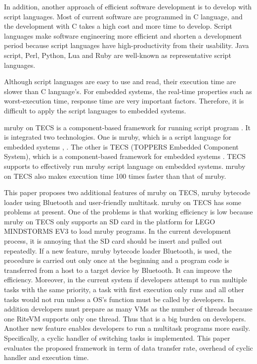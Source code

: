 \documentclass[conference,compsoc]{IEEEtran}
\begin{document}
In addition, another approach of efficient software development is to develop with script languages.
Most of current software are programmed in C language, and the development with C takes a high cost and more time to develop.
Script languages make software engineering more efficient and shorten a development period because script languages have high-productivity from their usability.
Java script, Perl, Python, Lua and Ruby are well-known as representative script languages.

Although script languages are easy to use and read, their execution time are slower than C language's.
For embedded systems, the real-time properties such as worst-execution time, response time are very important factors.
Therefore, it is difficult to apply the script languages to embedded systems.

mruby on TECS is a component-based framework for running script program \cite{par:mrubyonTECS}.
It is integrated two technologies.
One is mruby, which is a script language for embedded systems \cite{par:mruby}, \cite{url:mruby}.
The other is TECS (TOPPERS Embedded Component System), which is a component-based framework for embedded systems \cite{par:TECS}.
TECS supports to effectively run mruby script language on embedded systems.
mruby on TECS also makes execution time 100 times faster than that of mruby.

This paper proposes two additional features of mruby on TECS, mruby bytecode loader using Bluetooth and user-friendly multitask.
mruby on TECS has some problems at present.
One of the problems is that working efficiency is low because mruby on TECS only supports an SD card in the platform for LEGO MINDSTORMS EV3 \cite{par:EV3} to load mruby programs.
In the current development process, it is annoying that the SD card should be insert and pulled out repeatedly.
If a new feature, mruby bytecode loader Bluetooth, is used, the procedure is carried out only once at the beginning and a program code is transferred from a host to a target device by Bluetooth.
It can improve the efficiency.
Moreover, in the current system if developers attempt to run multiple tasks with the same priority, a task with first execution only runs and all other tasks would not run unless a OS's function must be called by developers.
In addition developers must prepare as many VMs as the number of threads because one RiteVM supports only one thread.
Thus that is a big burden on developers.
Another new feature enables developers to run a multitask programs more easily.
Specifically, a cyclic handler of switching tasks is implemented.
This paper evaluates the proposed framework in term of data transfer rate, overhead of cyclic handler and execution time.
\end{document}
